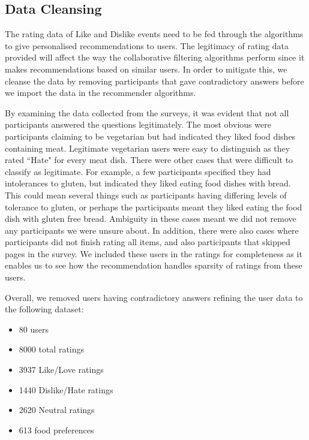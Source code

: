 \subsection{Data Cleansing}

The rating data of Like and Dislike events need to be fed through the algorithms to give personalised recommendations to users. The legitimacy of rating data provided will affect the way the collaborative filtering algorithms perform since it makes recommendations based on similar users. In order to mitigate this, we cleanse the data by removing participants that gave contradictory answers before we import the data in the recommender algorithms.


By examining the data collected from the surveys, it was evident that not all participants answered the questions legitimately. The most obvious were participants claiming to be vegetarian but had indicated they liked food dishes containing meat. Legitimate vegetarian users were easy to distinguish as they rated ``Hate" for every meat dish. There were other cases that were difficult to classify as legitimate. For example, a few participants specified they had intolerances to gluten, but indicated they liked eating food dishes with bread. This could mean several things such as participants having differing levels of tolerance to gluten, or perhaps the participants meant they liked eating the food dish with gluten free bread. Ambiguity in these cases meant we did not remove any participants we were unsure about. In addition, there were also cases where participants did not finish rating all items, and also participants that skipped pages in the survey. We included these users in the ratings for completeness as it enables us to see how the recommendation handles sparsity of ratings from these users. 

Overall, we removed users having contradictory answers refining the user data to the following dataset:
\begin{itemize}
	\item{80 users}
	\item{8000 total ratings}
	\item{3937 Like/Love ratings}
	\item{1440 Dislike/Hate ratings}
    \item{2620 Neutral ratings}
	\item{613 food preferences}
\end{itemize}

